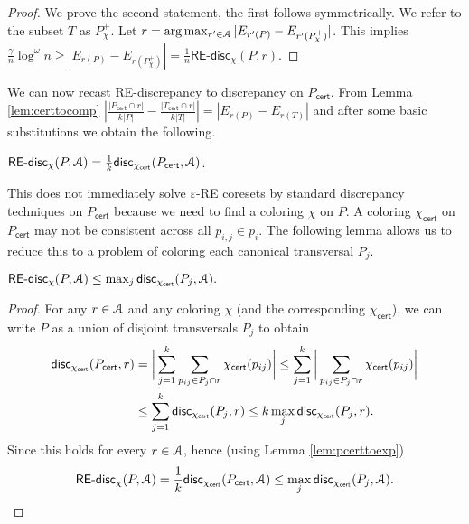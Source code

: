 \documentclass[11pt]{myclass}
\newcommand{\eps}{\varepsilon}
\newcommand{\Eu}[1]{\ensuremath{\EuScript{#1}}}
\newcommand{\disc}{\textsf{disc}}
\newcommand{\cert}{\textsf{cert}}
\newcommand{\RE}{\textsf{RE}\xspace}
\newcommand{\REd}{\RE\text{-}\disc}
\begin{document}
\begin{proof}
We prove the second statement, the first follows symmetrically.  
We refer to the subset $T$ as $P_\chi^+$.  
Let  $r = \arg \max_{r' \in \Eu{A}} |E_{r'(P)} - E_{r'(P_\chi^+)}|$.  This implies  
$
\frac{\gamma}{n} \log^\omega n
\geq 
| E_{r(P)} - E_{r(P_\chi^+)} | 
= 
\frac{1}{n} \REd_\chi(P,r). $
\end{proof}

We can now recast \RE-discrepancy to discrepancy on $P_\cert$. From  Lemma \ref{lem:certtocomp} 
$\left| \frac{|P_\cert \cap r|}{k |P|} - \frac{|T_\cert \cap r|}{k |T|} \right| =\left|  E_{r(P)} - E_{r(T)} \right|$ and
after some basic substitutions we obtain the following.  

\begin{lemma}\label{lem:pcerttoexp}
$\REd_\chi(P,\Eu{A}) = 
\frac{1}{k} \disc_{\chi_{\cert}} (P_\cert , \Eu{A})$.
\end{lemma}


This does not immediately solve $\eps$-\RE coresets by standard discrepancy  techniques on $P_\cert$ because we need to find a coloring $\chi$ on $P$.  A coloring $\chi_\cert$ on $P_\cert$ may not be consistent across all $p_{i,j} \in p_i$.
The following lemma allows us to reduce this to a problem of coloring each canonical transversal $P_j$.  



\begin{lemma}\label{lem:jointdisc}
$\REd_{\chi}(P,\Eu{A}) \leq  \max_j \disc_{\chi_\cert}(P_j, \Eu{A}).$
\end{lemma} 
\begin{proof}
For any $r \in \Eu{A}$ and any coloring $\chi$ (and the corresponding $\chi_\cert$), we can write $P$ as a union of disjoint transversals $P_j$ to obtain 
\begin{align*}
 \disc_{\chi_\cert}(P_\cert,r) 
 &=
\bigg|\sum_{j=1}^k \sum_{p_{ij} \in P_j \cap r} \chi_\cert(p_{ij}) \bigg|  
\leq 
\sum_{j=1}^k \bigg| \sum_{p_{ij} \in P_j \cap r} \chi_\cert(p_{ij}) \bigg| 
\\ & \leq
 \sum_{j=1}^k \disc_{\chi_\cert} (P_j, r) 
\leq
k \max_j \disc_{\chi_\cert}(P_j,r).	  
\vspace{-3mm}
\end{align*}
Since this holds for every $r \in \Eu{A}$, hence (using Lemma \ref{lem:pcerttoexp})
\[
\REd_\chi(P,\Eu{A})  = \frac{1}{k} \disc_{\chi_\cert}(P_\cert,\Eu{A}) \leq \max_j \disc_{\chi_\cert}(P_j, \Eu{A}). \qedhere
\]
\end{proof}
\end{document}
